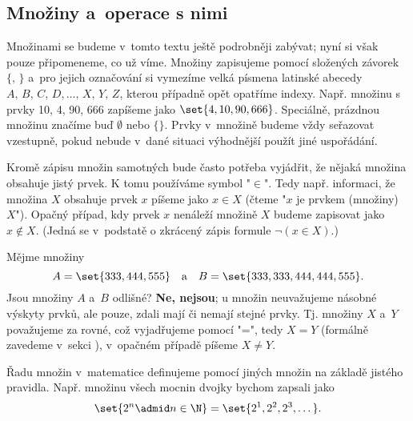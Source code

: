 \subsection{Množiny a~operace s nimi}\label{subsec:mnoziny_a_operace_s_nimi}

Množinami se budeme v~tomto textu ještě podrobněji zabývat; nyní si však pouze připomeneme, co už víme. Množiny zapisujeme pomocí složených závorek $\{,\,\}$ a~pro jejich označování si vymezíme velká písmena latinské abecedy\linebreak $A,\,B,\,C,\,D,\dots,\,X,\,Y,\,Z$, kterou případně opět opatříme indexy. Např. množinu s prvky 10, 4, 90, 666 zapíšeme jako $\set{4, 10, 90, 666}$. Speciálně, prázdnou množinu značíme buď $\emptyset$ nebo $\{\}$. Prvky v~množině budeme vždy seřazovat vzestupně, pokud nebude v~dané situaci výhodnější použít jiné uspořádání.\par
Kromě zápisu množin samotných bude často potřeba vyjádřit, že nějaká množina obsahuje jistý prvek. K tomu používáme symbol "$\in$". Tedy např. informaci, že množina $X$ obsahuje prvek $x$ píšeme jako $x\in X$ (čteme "$x$ je prvkem (množiny) $X$"). Opačný případ, kdy prvek $x$ nenáleží množině $X$ budeme zapisovat jako $x \notin X$. (Jedná se v~podstatě o zkrácený zápis formule $\neg (x \in X)$.)\par
Mějme množiny
\begin{equation*}
    A=\set{333, 444, 555}\quad\text{a}\quad B=\set{333, 333, 444, 444, 555}.
\end{equation*}
Jsou množiny $A$ a~$B$ odlišné? \textbf{Ne, nejsou}; u množin neuvažujeme násobné výskyty prvků, ale pouze, zdali mají či nemají stejné prvky. Tj. množiny $X$ a~$Y$ považujeme za rovné, což vyjadřujeme pomocí "=", tedy $X=Y$ (formálně zavedeme v~sekci ), v~opačném případě píšeme $X \neq Y$.\par
Řadu množin v~matematice definujeme pomocí jiných množin na základě jistého pravidla. Např. množinu všech mocnin dvojky bychom zapsali jako
\begin{equation*}
    \set{2^n \admid n \in \N}=\set{2^1, 2^2, 2^3, \dots}.
\end{equation*}

